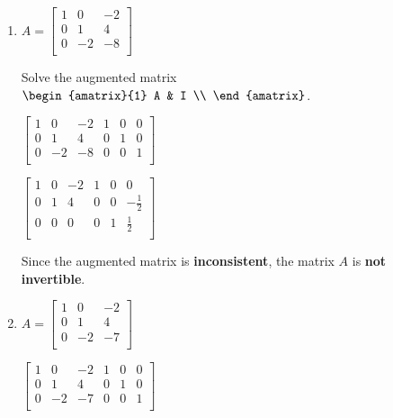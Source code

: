 \documentclass[12pt, letterpaper]{article}
\begin{document}
\begin{enumerate}
  \item $ A =
    \begin{bmatrix}
      1 & 0 & -2 \\
      0 & 1 & 4 \\
      0 & -2 & -8 \\
    \end{bmatrix} $
    \bigskip

    Solve the augmented matrix $
    \begin{amatrix}{1}
      A & I \\
    \end{amatrix} $.
    \bigskip

    \medskip
    {\centering

      $
      \begin{bmatrix}
        1 & 0 & -2 & 1 & 0 & 0 \\
        0 & 1 & 4 & 0 & 1 & 0 \\
        0 & -2 & -8 & 0 & 0 & 1 \\
      \end{bmatrix} $
      \bigskip

      $
      \begin{bmatrix}
        1 & 0 & -2 & 1 & 0 & 0 \\
        0 & 1 & 4 & 0 & 0 & -\frac{1}{2} \\
        0 & 0 & 0 & 0 & 1 & \frac{1}{2} \\
      \end{bmatrix} $
      \bigskip

    }
    \medskip

    Since the augmented matrix is \textbf{inconsistent}, the matrix $
    A $ is \textbf{not invertible}.

  \item $ A =
    \begin{bmatrix}
      1 & 0 & -2 \\
      0 & 1 & 4 \\
      0 & -2 & -7 \\
    \end{bmatrix} $
    \bigskip

    \medskip
    {\centering

      $
      \begin{bmatrix}
        1 & 0 & -2 & 1 & 0 & 0 \\
        0 & 1 & 4 & 0 & 1 & 0 \\
        0 & -2 & -7 & 0 & 0 & 1 \\
      \end{bmatrix} $
      \bigskip

}
\end{enumerate}
\end{document}
